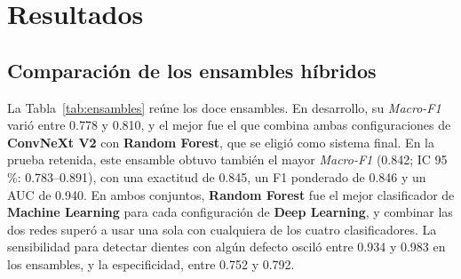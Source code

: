 \documentclass[runningheads]{llncs}
\newcommand{\sol}[1]{\textcolor{solucion}{\textbf{#1}}}
\newcommand{\sol}[1]{#1}
\begin{document}
\section{Resultados}

\subsection{Comparación de los ensambles híbridos}
La Tabla~\ref{tab:ensambles} reúne los doce ensambles. En desarrollo,
su \textit{Macro-F1} varió entre 0.778 y 0.810, y el mejor fue el que
combina ambas configuraciones de \sol{ConvNeXt V2} con \sol{Random
Forest}, que se eligió como sistema final. En la prueba retenida, este
ensamble obtuvo también el mayor \textit{Macro-F1} (0.842; IC 95\,\%:
0.783--0.891), con una exactitud de 0.845, un F1 ponderado de 0.846 y un
AUC de 0.940. En ambos
conjuntos, \sol{Random Forest} fue el mejor clasificador de \sol{Machine
Learning} para cada configuración de \sol{Deep Learning}, y combinar las
dos redes superó a usar una sola con cualquiera de los cuatro
clasificadores. La sensibilidad para detectar dientes con algún defecto
osciló entre 0.934 y 0.983 en los ensambles, y la especificidad, entre
0.752 y 0.792.
\end{document}
